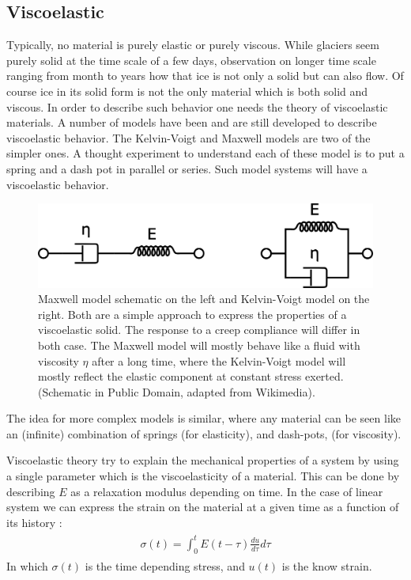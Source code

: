 \documentclass[A4paperpaper,11pt,english]{sphinxmanual}
\begin{document}
\subsection{Viscoelastic}
\label{parts/part1:id70}
Typically, no material is purely elastic or purely viscous. While glaciers
seem purely solid at the time scale of a few days, observation on longer time
scale ranging from month to years how that ice is not only a
solid but can also flow. Of course ice in its solid form is not the only
material which is both solid and viscous. In order to describe such
behavior one needs the theory of viscoelastic materials.  A number of models have
been and are still developed to describe viscoelastic behavior. The
Kelvin-Voigt and Maxwell models are two of the simpler ones. A thought
experiment to understand each of these model is to put a spring and a dash pot
in parallel or series. Such model systems will have a viscoelastic behavior.
\begin{figure}[htbp]
\centering
\capstart

\includegraphics[width=0.700\linewidth]{MKV.png}
\caption{Maxwell model schematic on the left and Kelvin-Voigt model on the right.
Both are a simple approach to express the properties of a viscoelastic
solid. The response to a creep compliance will differ in both case. The Maxwell
model will mostly behave like  a fluid with viscosity \(\eta\) after a
long time, where the Kelvin-Voigt model will mostly reflect the elastic
component at constant stress exerted. (Schematic in Public Domain, adapted
from Wikimedia).}\end{figure}

The idea for more complex models is similar, where any material can be seen like an
(infinite) combination of springs (for elasticity), and dash-pots, (for viscosity).

Viscoelastic theory try to explain the mechanical properties of a system by
using a single parameter which is the viscoelasticity of a material. This can
be done by describing \(E\) as a relaxation modulus depending on time.  In
the case of linear system we can express the strain on the material at a given
time as a function of its history :
\label{parts/part1:equation-strain}\begin{gather}
\begin{split}\sigma (t)  = \int_0^t E(t-\tau) \frac{du}{d\tau} d\tau\end{split}\label{parts/part1-strain}
\end{gather}
In which \(\sigma(t)\) is the time depending stress, and \(u(t)\) is
the know strain.
\end{document}
